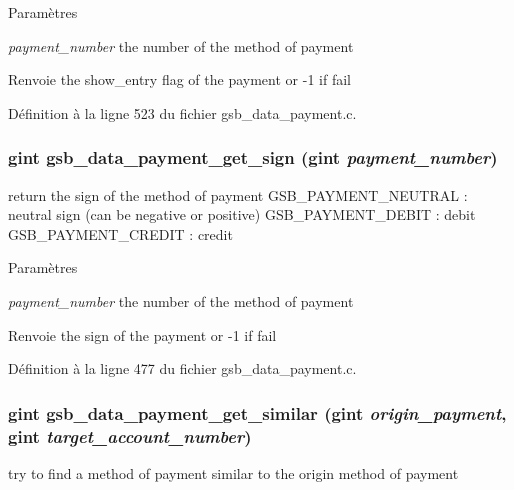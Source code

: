 \begin{DoxyParams}{Paramètres}
\item[{\em payment\_\-number}]the number of the method of payment\end{DoxyParams}
\begin{DoxyReturn}{Renvoie}
the show\_\-entry flag of the payment or -\/1 if fail 
\end{DoxyReturn}


Définition à la ligne 523 du fichier gsb\_\-data\_\-payment.c.

\subsubsection[{gsb\_\-data\_\-payment\_\-get\_\-sign}]{\setlength{\rightskip}{0pt plus 5cm}gint gsb\_\-data\_\-payment\_\-get\_\-sign (gint {\em payment\_\-number})}\label{gsb__data__payment_8c_a18c88a62c285b34be984f88c03dc2e70}
return the sign of the method of payment GSB\_\-PAYMENT\_\-NEUTRAL : neutral sign (can be negative or positive) GSB\_\-PAYMENT\_\-DEBIT : debit GSB\_\-PAYMENT\_\-CREDIT : credit


\begin{DoxyParams}{Paramètres}
\item[{\em payment\_\-number}]the number of the method of payment\end{DoxyParams}
\begin{DoxyReturn}{Renvoie}
the sign of the payment or -\/1 if fail 
\end{DoxyReturn}


Définition à la ligne 477 du fichier gsb\_\-data\_\-payment.c.

\subsubsection[{gsb\_\-data\_\-payment\_\-get\_\-similar}]{\setlength{\rightskip}{0pt plus 5cm}gint gsb\_\-data\_\-payment\_\-get\_\-similar (gint {\em origin\_\-payment}, \/  gint {\em target\_\-account\_\-number})}\label{gsb__data__payment_8c_abcd7cbec25fc03ab15e1faeda58ba32d}
try to find a method of payment similar to the origin method of payment


